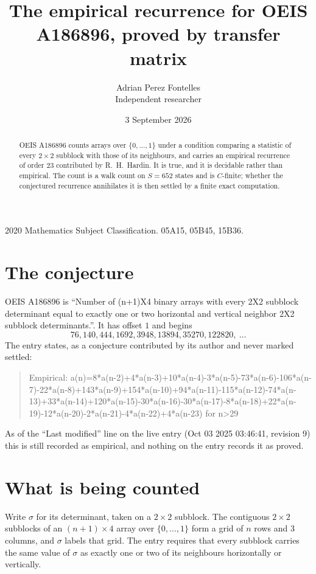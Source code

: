 \documentclass[11pt,a4paper]{article}
\title{The empirical recurrence for OEIS A186896, proved by transfer matrix}
\author{Adrian Perez Fontelles\\ \small Independent researcher}
\date{3 September 2026}
\theoremstyle{plain}
\theoremstyle{definition}
\begin{document}
\maketitle

\begin{abstract}
OEIS A186896 counts arrays over $\{0,\dots,1\}$ under a condition comparing a statistic of
every $2\times2$ subblock with those of its neighbours, and carries an empirical recurrence
of order $23$ contributed by R.~H.~Hardin. It is true, and it is decidable rather than
empirical. The count is a walk count on $S=652$ states and is $C$-finite; whether the
conjectured recurrence annihilates it is then settled by a finite exact computation.
\end{abstract}

\noindent\small 2020 Mathematics Subject Classification. 05A15, 05B45, 15B36.\normalsize

\section{The conjecture}

OEIS A186896 is ``Number of (n+1)X4 binary arrays with every 2X2 subblock determinant equal to exactly one or two horizontal and vertical neighbor 2X2 subblock determinants.''. It has offset $1$ and begins
\[
76, 140, 444, 1692, 3948, 13894, 35270, 122820,\ \dots
\]
The entry states, as a conjecture contributed by its author and never marked settled:
\begin{quote}
Empirical: a(n)=8*a(n-2)+4*a(n-3)+10*a(n-4)-3*a(n-5)-73*a(n-6)-106*a(n-7)-22*a(n-8)+143*a(n-9)+154*a(n-10)+94*a(n-11)-115*a(n-12)-74*a(n-13)+33*a(n-14)+120*a(n-15)-30*a(n-16)-30*a(n-17)-8*a(n-18)+22*a(n-19)-12*a(n-20)-2*a(n-21)-4*a(n-22)+4*a(n-23) for n>29
\end{quote}
As of the ``Last modified'' line on the live entry (Oct 03 2025 03:46:41, revision 9) this is still
recorded as empirical, and nothing on the entry records it as proved.

\section{What is being counted}

Write $\sigma$ for its determinant, taken on a $2\times2$ subblock. The contiguous $2\times2$
subblocks of an $(n+1)\times4$ array over $\{0,\dots,1\}$ form a grid of $n$ rows
and $3$ columns, and $\sigma$ labels that grid. The entry
requires that every subblock carries the same value of $\sigma$ as exactly one or two of its neighbours horizontally or vertically.
\end{document}
